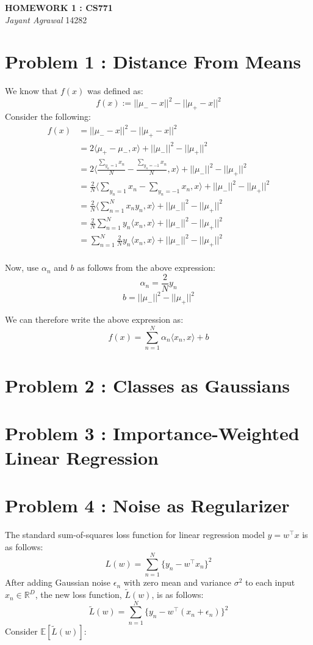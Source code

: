 \documentclass{article}
\begin{document}

\begin{center}
\textbf{\Large HOMEWORK 1 : CS771} \\
\textit{\large Jayant Agrawal}         14282
\end{center}

\section{Problem 1 : Distance From Means}
We know that $f(x)$ was defined as:
$$f(x) := ||\mu_- - x||^2  - ||\mu_+ - x||^2 $$
Consider the following:
\begin{equation*}
\begin{aligned}
f(x) &= ||\mu_- - x||^2  - ||\mu_+ - x||^2 \\
& = 2\langle\mu_+ - \mu_- , x \rangle + ||\mu_-||^2 - ||\mu_+||^2 \\
& = 2\langle \frac{\sum_{y_n = 1}x_n}{N} - \frac{\sum_{y_n = -1}x_n}{N} , x \rangle + ||\mu_-||^2 - ||\mu_+||^2 \\
& = \frac{2}{N} \langle \sum_{y_n = 1}x_n - \sum_{y_n = -1}x_n , x \rangle + ||\mu_-||^2 - ||\mu_+||^2 \\
& = \frac{2}{N} \langle \sum_{n = 1}^Nx_ny_n, x \rangle + ||\mu_-||^2 - ||\mu_+||^2 \\
& = \frac{2}{N} \sum_{n = 1}^Ny_n \langle x_n, x \rangle + ||\mu_-||^2 - ||\mu_+||^2 \\
& = \sum_{n = 1}^N\frac{2}{N} y_n \langle x_n, x \rangle + ||\mu_-||^2 - ||\mu_+||^2 \\
\end{aligned}
\end{equation*}

Now, use $\alpha_n$ and $b$ as follows from the above expression:
$$\alpha_n = \frac{2}{N}y_n$$
$$b = ||\mu_-||^2 - ||\mu_+||^2$$

We can therefore write the above expression as:
$$f(x) = \sum_{n=1}^N \alpha_n \langle x_n,x \rangle + b$$
\section{Problem 2 : Classes as Gaussians}
\section{Problem 3 : Importance-Weighted Linear Regression}
\section{Problem 4 : Noise as Regularizer}
The standard sum-of-squares loss function for linear regression model $y=w^\top x$ is as follows:
$$L(w) = \sum_{n=1}^N \{y_n - w^\top x_n\}^2$$
After adding Gaussian noise $\epsilon_n$ with zero mean and variance $\sigma^2$ to each input $x_n \in \mathds{R}^D$, the new loss function, $\tilde{L}(w)$, is as follows:
$$\tilde{L}(w) = \sum_{n=1}^N\{y_n-w^\top(x_n+\epsilon_n)\}^2$$
Consider $\mathds{E}[\tilde{L}(w)]$:
\end{document}
